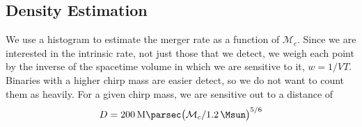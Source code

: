 \subsection{Density Estimation}

We use a histogram to estimate the merger rate as a function of $\mathcal{M}_c$. Since we are interested in the intrinsic rate, not just those that we detect, we weigh each point by the inverse of the spacetime volume in which we are sensitive to it, $w = 1 / VT$. Binaries with a higher chirp mass are easier detect, so we do not want to count them as heavily. For a given chirp mass, we are sensitive out to a distance of
%
\begin{equation}
  D =
  \SI{200}{\mega\parsec} \qty( \mathcal{M}_c / \SI{1.2}{\Msun} )^{5/6}
\end{equation}